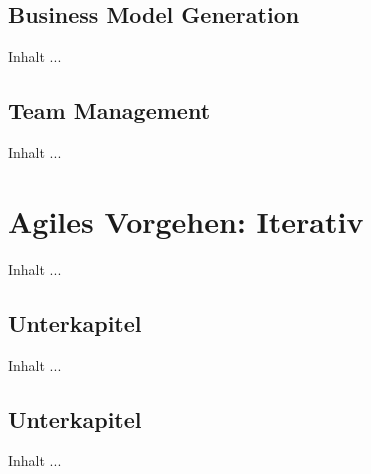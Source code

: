 \subsection{Business Model Generation}
Inhalt ...

\subsection{Team Management}
Inhalt ...



\section{Agiles Vorgehen: Iterativ}
Inhalt ...

\subsection{Unterkapitel}
Inhalt ...

\subsection{Unterkapitel}
Inhalt ...
